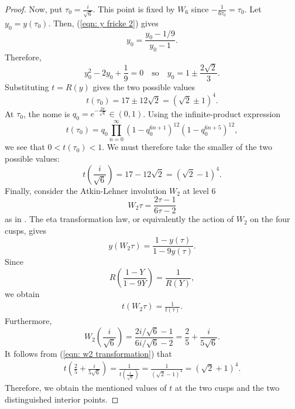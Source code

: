 \documentclass[12pt, a4paper]{amsart}
\theoremstyle{definition}
\numberwithin{theorem}{section}
\begin{document}
\begin{proof}
Now, put $\tau_0=\frac{i}{\sqrt{6}}$. This point is fixed by \(W_6\) since $-\frac{1}{6\tau_0}=\tau_0$. Let $y_0=y\left(\tau_0\right)$. Then, (\ref{eqn: y fricke 2}) gives
\[y_0=\frac{y_0-1/9}{y_0-1}.\]
Therefore,
\[y_0^2-2y_0+\frac{1}{9}=0\quad\text{so}\quad y_0=1\pm\frac{2\sqrt{2}}{3}.
\]
Substituting \(t=R\left(y\right)\) gives the two possible values
\[t\left(\tau_0\right)=17\pm12\sqrt{2}=\left(\sqrt{2}\pm1\right)^4.\]
At \(\tau_0\), the nome is $q_0=e^{-\frac{2\pi}{\sqrt{6}}}\in\left(0,1\right)$. Using the infinite-product expression
\[t\left(\tau_0\right)=q_0\prod_{n=0}^{\infty}\left(1-q_0^{6n+1}\right)^{12}\left(1-q_0^{6n+5}\right)^{12},\]
we see that $0<t\left(\tau_0\right)<1$. We must therefore take the smaller of the two possible values:
\[t\left(\frac{i}{\sqrt{6}}\right)=17-12\sqrt{2}
=\left(\sqrt{2}-1\right)^4.\]
Finally, consider the Atkin-Lehner involution $W_2$ at level 6 
\[W_2\tau=\frac{2\tau-1}{6\tau-2}
\]
as in \cite{AtkinLehner1970}. The eta transformation law, or equivalently the action of \(W_2\) on the four cusps, gives
\[
y\left(W_2\tau\right)
=
\frac{1-y\left(\tau\right)}
{1-9y\left(\tau\right)}.
\]
Since
\[
R\left(\frac{1-Y}{1-9Y}\right)
=
\frac{1}{R\left(Y\right)},
\]
we obtain
\begin{align}\label{eqn: w2 transformation}
t\left(W_2\tau\right)=\frac{1}{t\left(\tau\right)}.
\end{align}
Furthermore,
\[W_2\left(\frac{i}{\sqrt{6}}\right)=\frac{2i/\sqrt{6}-1}{6i/\sqrt{6}-2}=\frac{2}{5}+\frac{i}{5\sqrt{6}}.
\]
It follows from (\ref{eqn: w2 transformation}) that
\begin{align*}
t\left(\frac{2}{5}+\frac{i}{5\sqrt{6}}\right)=\frac{1}{t\left(\frac{i}{\sqrt{6}}\right)}=\frac{1}{\left(\sqrt{2}-1\right)^4}=\left(\sqrt{2}+1\right)^4.
\end{align*}
Therefore, we obtain the mentioned values of $t$ at the two cusps and the two distinguished interior points.
\end{proof}
\end{document}
